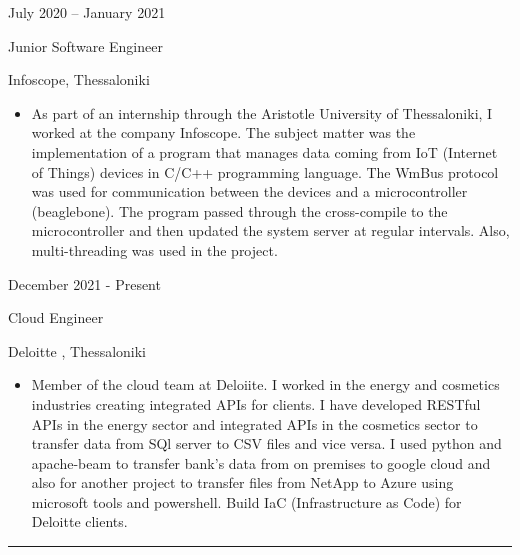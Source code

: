 \documentclass[a4paper,10pt]{article}
\newlength{\cvcolumngapwidth}
\newlength{\cvleftcolumnwidth}
\newlength{\cvrightcolumnwidth}
\newcommand{\cvsectionstyle}[1]{{\normalsize\cvsectionfont\textcolor{cvsectioncolor}{#1}}}
\newcommand{\cvtitlestyle}[1]{{\large\cvtitlefont\textcolor{cvtitlecolor}{#1}}}
\newcommand{\cvdurationstyle}[1]{{\small\cvdurationfont\textcolor{cvdurationcolor}{#1}}}
\newlength{\cvafteritemskipamount}
\newlength{\cvaftersectionskipamount}
\newlength{\cvaftertitleskipamount}
\newlength{\cvparskip}
\newcommand{\cvsection}[1]{
    \begin{minipage}[t]{\cvleftcolumnwidth}
        \raggedleft\cvsectionstyle{#1}
    \end{minipage}%
    \hspace{\cvcolumngapwidth}%
    \begin{minipage}[t]{\cvrightcolumnwidth}
        \textcolor{cvrulecolor}{\rule{\cvrightcolumnwidth}{0.3mm}}
    \end{minipage}

    \vspace{\cvaftersectionskipamount}
}
\newcommand{\cvitem}[2]{
    \begin{minipage}[t]{\cvleftcolumnwidth}
        \raggedleft #1
    \end{minipage}%
    \hspace{\cvcolumngapwidth}%
    \begin{minipage}[t]{\cvrightcolumnwidth}
        \setlength{\parskip}{\cvparskip} #2
    \end{minipage}

    \vspace{\cvafteritemskipamount}
}
\newcommand{\cvtitle}[1]{
    \cvtitlestyle{#1}

    \vspace{\cvaftertitleskipamount}
    \vspace{-\cvparskip}
}
\begin{document}
\cvitem{
    \cvdurationstyle{July 2020 -- January 2021}
}{
    \cvtitle{Junior Software Engineer}

    Infoscope, Thessaloniki

    \begin{itemize}[leftmargin=*]
        \item As part of an internship through the Aristotle University of Thessaloniki, I worked at the company Infoscope. The subject matter was the implementation of a program that manages data coming from IoT (Internet of Things) devices in C/C++ programming language. The WmBus protocol was used for communication between the devices and a microcontroller (beaglebone). The program passed through the cross-compile to the microcontroller and then updated the system server at regular intervals. Also, multi-threading was used in the project.   
             
       
    \end{itemize}
}
\cvitem{
    \cvdurationstyle{December 2021 - Present}
}{

    \cvtitle{Cloud Engineer}  
    Deloitte , Thessaloniki

    \begin{itemize}[leftmargin=*]
        \item Member of the cloud team at Deloiite. I worked in the energy and cosmetics industries creating integrated APIs for clients. I have developed  RESTful APIs in the energy sector and integrated APIs in the cosmetics sector to transfer data from SQl server to CSV files and vice versa. I used python and apache-beam to transfer bank's data from on premises to google cloud  and also for another project to transfer files from NetApp to Azure using microsoft tools and powershell. Build IaC (Infrastructure as Code)  for Deloitte clients.
    \end{itemize}


}





\cvsection{EDUCATION}



\end{document}
